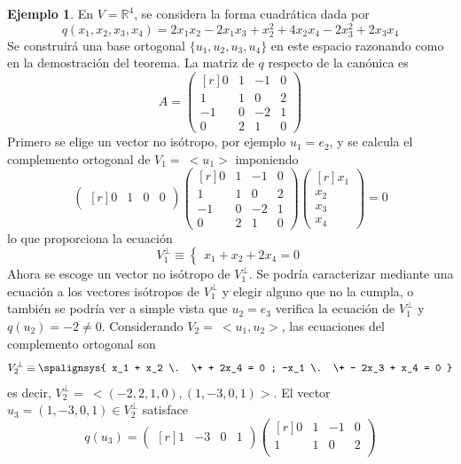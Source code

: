 \documentclass[12pt]{report}
\theoremstyle{definition}
\theoremstyle{definition}
\newtheorem{example}{Ejemplo}[chapter]
\theoremstyle{remark}
\newcommand{\R}{\mathbb R}
\begin{document}
\begin{example}
En $V = \R^4$, se considera la forma cuadrática dada por
\[q(x_1,x_2,x_3,x_4) = 2x_1x_2-2x_1x_3+x_2^2+4x_2x_4-2x_3^2+2x_3x_4\]
Se construirá una base ortogonal $\{u_1,u_2,u_3,u_4\}$ en este espacio razonando como en la demostración del teorema. La matriz de $q$ respecto de la canónica es
\[A = \begin{pmatrix*}[r]
    0 & 1 & -1 & 0 \\
    1 & 1 & 0 & 2 \\
    -1 & 0 & -2 & 1 \\
    0 & 2 & 1 & 0
\end{pmatrix*}\]
Primero se elige un vector no isótropo, por ejemplo $u_1 = e_2$, y se calcula el complemento ortogonal de $V_1 = \ < u_1>$ imponiendo
\[\begin{pmatrix*}[r]
    0 & 1 & 0 & 0
\end{pmatrix*} \begin{pmatrix*}[r]
    0 & 1 & -1 & 0 \\
    1 & 1 & 0 & 2 \\
    -1 & 0 & -2 & 1 \\
    0 & 2 & 1 & 0
\end{pmatrix*} \begin{pmatrix*}[r]
    x_1 \\
    x_2 \\
    x_3 \\
    x_4
\end{pmatrix*} = 0
 \]
 lo que proporciona la ecuación
 \[V_1^\perp \equiv \begin{cases}
     x_1+x_2+2x_4=0
 \end{cases}\]
Ahora se escoge un vector no isótropo de $V_1^\perp$. Se podría caracterizar mediante una ecuación a los vectores isótropos de $V_1^\perp$ y elegir alguno que no la cumpla, o también se podría ver a simple vista que $u_2 = e_3$ verifica la ecuación de $V_1^\perp$ y $q(u_2)=-2\neq 0$. Considerando $V_2 = \ <u_1,u_2>$, las ecuaciones del complemento ortogonal son
\[ V_2^\perp \equiv
\spalignsys{
x_1 + x_2 \. \+ + 2x_4 = 0 ;
-x_1 \. \+ - 2x_3 + x_4 = 0
}
\]
es decir, $V_2^\perp = \ <(-2,2,1,0),(1,-3,0,1)>$. El vector $u_3 = (1,-3,0,1) \in V_2^\perp$ satisface
\[q(u_3)= \begin{pmatrix*}[r]
    1 & -3 & 0 & 1
\end{pmatrix*}\begin{pmatrix*}[r]
    0 & 1 & -1 & 0 \\
    1 & 1 & 0 & 2 \\

\end{pmatrix*}\]
\end{example}
\end{document}
